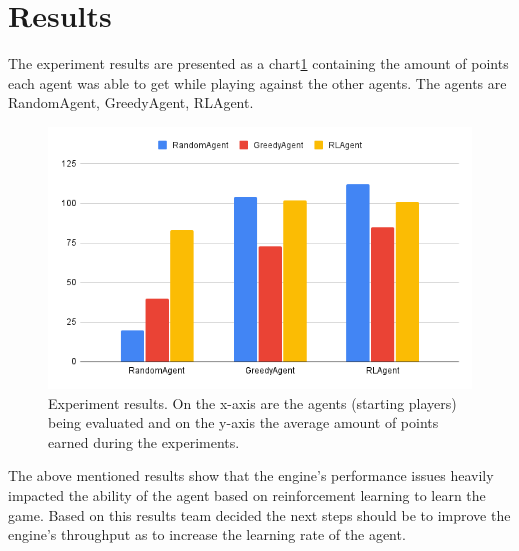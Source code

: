 \section{Results}

The experiment results are presented as a chart\ref{fig:Results} containing the amount of 
points each agent was able to get while playing against the other agents. The agents are
RandomAgent, GreedyAgent, RLAgent.

\begin{figure}[h]
	\includegraphics[width=\linewidth]{figures/chart}
	\caption{Experiment results. On the x-axis are the agents (starting players) being evaluated and on the y-axis the average amount of points earned during the experiments.}
	\label{fig:Results}
\end{figure}

The above mentioned results show that the engine's performance issues heavily
impacted the ability of the agent based on reinforcement learning to learn the game.
Based on this results team decided the next steps should be to improve the engine's
throughput as to increase the learning rate of the agent.
